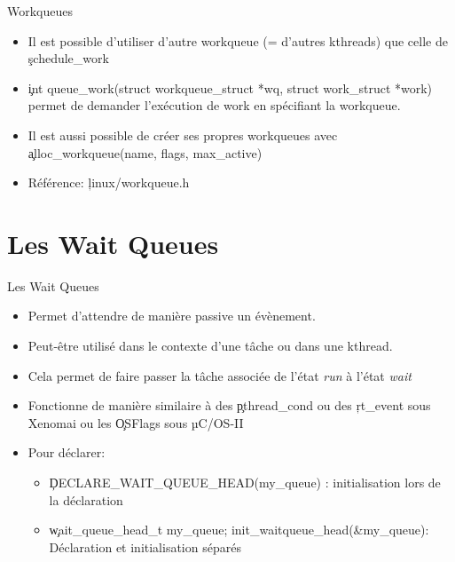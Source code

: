 \begin{frame}[fragile=singleslide]{Workqueues}
  \begin{itemize}
  \item  Il  est possible  d'utiliser  d'autre  workqueue (=  d'autres
    kthreads) que celle de \c{schedule_work}
  \item
    \c{int queue_work(struct workqueue_struct *wq, struct work_struct *work)}
    permet de demander l'exécution de work en spécifiant la workqueue.
  \item  Il est  aussi possible  de créer  ses propres  workqueues avec
    \c{alloc_workqueue(name, flags, max_active)}
  \item Référence: \c{linux/workqueue.h}
  \end{itemize}
\end{frame}

\section{Les Wait Queues}

\begin{frame}[fragile=singleslide]{Les Wait Queues}
  \begin{itemize}
  \item Permet d'attendre de manière passive un évènement.
  \item Peut-être utilisé
    dans le contexte d'une tâche ou dans une kthread.
  \item  Cela permet  de  faire  passer la  tâche  associée de  l'état
    \emph{run} à l'état \emph{wait}
  \item Fonctionne de manière  similaire à des \c{pthread_cond} ou des
    \c{rt_event} sous Xenomai ou les \c{OSFlags} sous µC/OS-II
  \item Pour déclarer:
    \begin{itemize}
    \item \c{DECLARE_WAIT_QUEUE_HEAD(my_queue)} : initialisation lors de
      la déclaration
    \item
      \c{wait_queue_head_t  my_queue; init_waitqueue_head(&my_queue)}:
      Déclaration et initialisation séparés
    \end{itemize}
  \end{itemize}
\end{frame}

